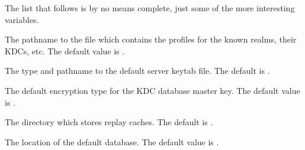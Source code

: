 \documentclass[letterpaper,10pt,english]{sphinxmanual}
\begin{document}
\sphinxAtStartPar
The list that follows is by no means complete, just some of the more
interesting variables.
\begin{description}
\sphinxAtStartPar
The pathname to the file which contains the profiles for the known
realms, their KDCs, etc. The default value is .

\sphinxAtStartPar
The type and pathname to the default server keytab file.  The
default is .

\sphinxAtStartPar
The default encryption type for the KDC database master key.  The
default value is .

\sphinxAtStartPar
The directory which stores replay caches.  The default is
.

\sphinxAtStartPar
The location of the default database.  The default value is
.

\end{description}



\renewcommand{\indexname}{Index}
\printindex
\end{document}
